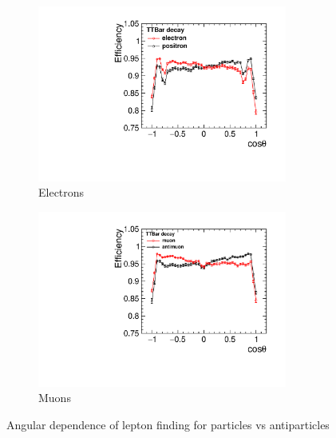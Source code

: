 \begin{figure}
  \centering
  \begin{subfigure}{.5\textwidth}
    \centering
    \includegraphics[width=0.9\textwidth]{TopAnalysis/figures/ElectronEfficiencys.pdf}
    \caption[Charge Tagging Efficiency]{Electrons}
    \label{fig:electronefficiency}
  \end{subfigure}%
  \begin{subfigure}{.5\textwidth}
    \centering
    \includegraphics[width=0.9\textwidth]{TopAnalysis/figures/MuonEfficiencys.pdf}
    \caption[Charge Tagging Efficiency]{Muons}
    \label{fig:muonefficiency}
  \end{subfigure}
  \caption{Angular dependence of lepton finding for particles vs antiparticles}
  \label{fig:chargeEfficiencies}
\end{figure}

